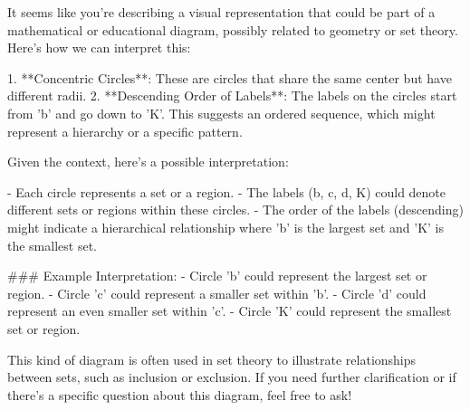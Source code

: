 It seems like you're describing a visual representation that could be part of a mathematical or educational diagram, possibly related to geometry or set theory. Here's how we can interpret this:

1. **Concentric Circles**: These are circles that share the same center but have different radii.
2. **Descending Order of Labels**: The labels on the circles start from 'b' and go down to 'K'. This suggests an ordered sequence, which might represent a hierarchy or a specific pattern.

Given the context, here’s a possible interpretation:

- Each circle represents a set or a region.
- The labels (b, c, d, K) could denote different sets or regions within these circles.
- The order of the labels (descending) might indicate a hierarchical relationship where 'b' is the largest set and 'K' is the smallest set.

### Example Interpretation:
- Circle 'b' could represent the largest set or region.
- Circle 'c' could represent a smaller set within 'b'.
- Circle 'd' could represent an even smaller set within 'c'.
- Circle 'K' could represent the smallest set or region.

This kind of diagram is often used in set theory to illustrate relationships between sets, such as inclusion or exclusion. If you need further clarification or if there's a specific question about this diagram, feel free to ask!